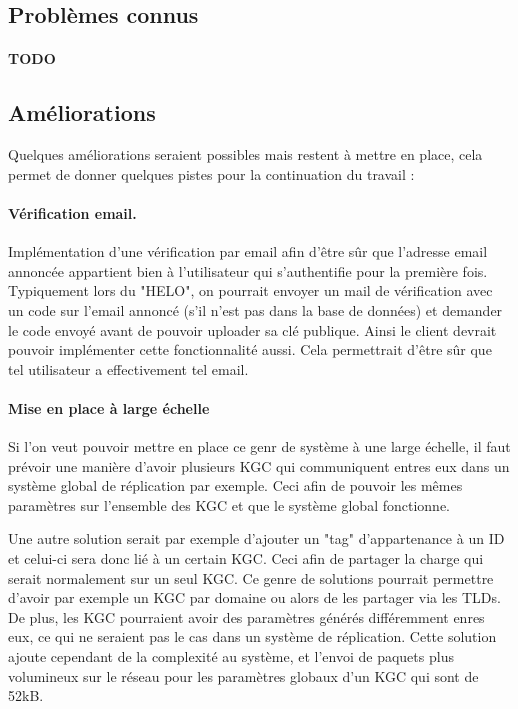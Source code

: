 \subsection{Problèmes connus}
\paragraph*{TODO}

\subsection{Améliorations}
Quelques améliorations seraient possibles mais restent à mettre en place, cela permet de donner quelques pistes pour la continuation du travail :
\paragraph*{Vérification email.}
Implémentation d'une vérification par email afin d'être sûr que l'adresse email annoncée appartient bien à l'utilisateur qui s'authentifie pour la première fois. Typiquement lors du "HELO", on pourrait envoyer un mail de vérification avec un code sur l'email annoncé (s'il n'est pas dans la base de données) et demander le code envoyé avant de pouvoir uploader sa clé publique. Ainsi le client devrait pouvoir implémenter cette fonctionnalité aussi. Cela permettrait d'être sûr que tel utilisateur a effectivement tel email.
\paragraph*{Mise en place à large échelle}
Si l'on veut pouvoir mettre en place ce genr de système à une large échelle, il faut prévoir une manière d'avoir plusieurs KGC qui communiquent entres eux dans un système global de réplication par exemple. Ceci afin de pouvoir les mêmes paramètres sur l'ensemble des KGC et que le système global fonctionne.

Une autre solution serait par exemple d'ajouter un "tag" d'appartenance à un ID et celui-ci sera donc lié à un certain KGC. Ceci afin de partager la charge qui serait normalement sur un seul KGC. Ce genre de solutions pourrait permettre d'avoir par exemple un KGC par domaine ou alors de les partager via les TLDs. De plus, les KGC pourraient avoir des paramètres générés différemment enres eux, ce qui ne seraient pas le cas dans un système de réplication. Cette solution ajoute cependant de la complexité au système, et l'envoi de paquets plus volumineux sur le réseau pour les paramètres globaux d'un KGC qui sont de 52kB.
